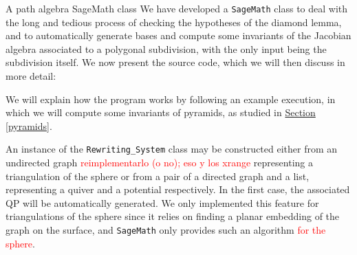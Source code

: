 \begin{chapter}{A path algebra SageMath class}
\label{appendix}
We have developed a \texttt{SageMath} class to deal with the long and tedious process of checking the hypotheses of the diamond lemma, and to automatically generate bases and compute some invariants of the Jacobian algebra associated to a polygonal subdivision, with the only input being the subdivision itself. We now present the source code, which we will then discuss in more detail:

We will explain how the program works by following an example execution, in which we will compute some invariants of pyramids, as studied in \hyperref[pyramids]{Section \ref*{pyramids}}.

An instance of the \texttt{Rewriting\_System} class may be constructed either from an undirected graph \textcolor{red}{reimplementarlo (o no); eso y los xrange} representing a triangulation of the sphere or from a pair of a directed graph and a list, representing a quiver and a potential respectively. In the first case, the associated QP will be automatically generated. We only implemented this feature for triangulations of the sphere since it relies on finding a planar embedding of the graph on the surface, and \texttt{SageMath} only provides such an algorithm \textcolor{red}{for the sphere}.


\end{chapter}
